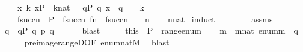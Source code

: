 \begin{isabellebody}
\ \ \ \ {\isachardoublequoteopen}{\isasymAnd}x\ k{\isachardot}{\kern0pt}\ x{\isasymin}P\ {\isasymLongrightarrow}\ k{\isasymin}nat\ {\isasymLongrightarrow}\ \ {\isasymexists}q{\isasymin}P{\isachardot}{\kern0pt}\ q{\isasympreceq}\ x\ {\isasymand}\ q\ {\isasymin}\ {\isasymD}\ {\isacharbackquote}{\kern0pt}\ k{\isachardoublequoteclose}\ \isanewline
\ \ \ \isanewline
\ \ \ \ {\isachardoublequoteopen}f{\isacharparenleft}{\kern0pt}succ{\isacharparenleft}{\kern0pt}n{\isacharparenright}{\kern0pt}{\isacharparenright}{\kern0pt}\ {\isasymin}\ P\ {\isasymand}\ f{\isacharparenleft}{\kern0pt}succ{\isacharparenleft}{\kern0pt}n{\isacharparenright}{\kern0pt}{\isacharparenright}{\kern0pt}{\isasympreceq}\ f{\isacharparenleft}{\kern0pt}n{\isacharparenright}{\kern0pt}\ {\isasymand}\ f{\isacharparenleft}{\kern0pt}succ{\isacharparenleft}{\kern0pt}n{\isacharparenright}{\kern0pt}{\isacharparenright}{\kern0pt}\ {\isasymin}\ {\isasymD}\ {\isacharbackquote}{\kern0pt}\ n{\isachardoublequoteclose}\isanewline
%
\isadelimproof
\ \ %
\endisadelimproof
%
\isatagproof
{}\isamarkupfalse%
\ {\isacartoucheopen}n{\isasymin}nat{\isacartoucheclose}\isanewline
{}\isamarkupfalse%
\ {\isacharparenleft}{\kern0pt}induct{\isacharparenright}{\kern0pt}\isanewline
\ \ \isamarkupfalse%
\ {}\isanewline
\ \ \isamarkupfalse%
\ assms\ \isanewline
\ \ \isamarkupfalse%
\ q\ \ {\isachardoublequoteopen}q{\isasymin}P{\isachardoublequoteclose}\ {\isachardoublequoteopen}q{\isasympreceq}\ p{\isachardoublequoteclose}\ {\isachardoublequoteopen}q\ {\isasymin}\ {\isasymD}\ {\isacharbackquote}{\kern0pt}\ {}{\isachardoublequoteclose}\ \isamarkupfalse%
\ blast\isanewline
\ \ \isamarkupfalse%
\ \isamarkupfalse%
\ this\ \ {\isacartoucheopen}P\ {\isasymsubseteq}\ range{\isacharparenleft}{\kern0pt}enum{\isacharparenright}{\kern0pt}{\isacartoucheclose}\isanewline
\ \ \isamarkupfalse%
\ m\ \ {\isachardoublequoteopen}m{\isasymin}nat{\isachardoublequoteclose}\ {\isachardoublequoteopen}enum{\isacharbackquote}{\kern0pt}m\ {\isacharequal}{\kern0pt}\ q{\isachardoublequoteclose}\ \isanewline
\ \ \ \ \isamarkupfalse%
\ preimage{\isacharunderscore}{\kern0pt}rangeD{\isacharbrackleft}{\kern0pt}OF\ {\isacartoucheopen}enum{\isacharcolon}{\kern0pt}nat{\isasymrightarrow}M{\isacartoucheclose}{\isacharbrackright}{\kern0pt}\ \isamarkupfalse%
\ blast\isanewline
\ \ \isamarkupfalse%

\end{isabellebody}
